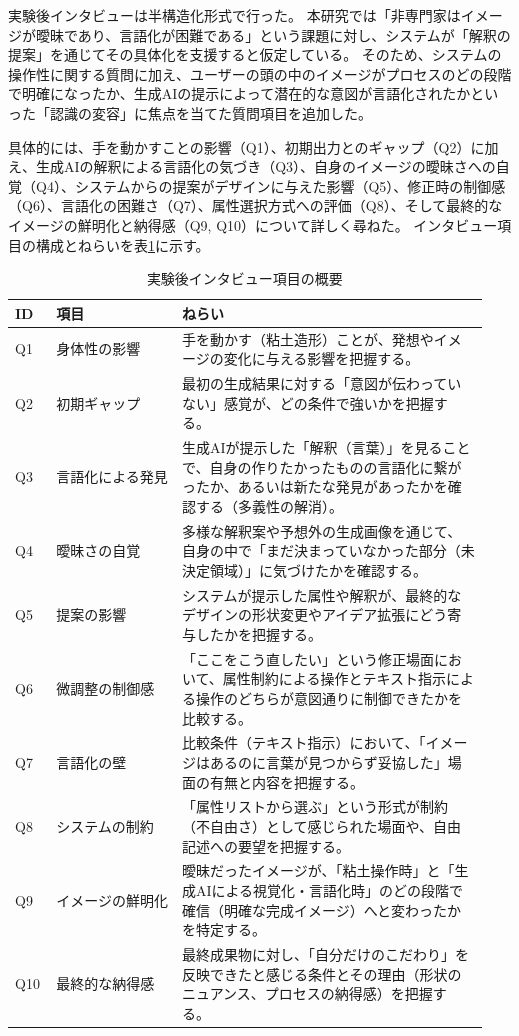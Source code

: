 \documentclass{kuisthesis}
\begin{document}
実験後インタビューは半構造化形式で行った。
本研究では「非専門家はイメージが曖昧であり、言語化が困難である」という課題に対し、システムが「解釈の提案」を通じてその具体化を支援すると仮定している。
そのため、システムの操作性に関する質問に加え、ユーザーの頭の中のイメージがプロセスのどの段階で明確になったか、生成AIの提示によって潜在的な意図が言語化されたかといった「認識の変容」に焦点を当てた質問項目を追加した。

具体的には、手を動かすことの影響（Q1）、初期出力とのギャップ（Q2）に加え、生成AIの解釈による言語化の気づき（Q3）、自身のイメージの曖昧さへの自覚（Q4）、システムからの提案がデザインに与えた影響（Q5）、修正時の制御感（Q6）、言語化の困難さ（Q7）、属性選択方式への評価（Q8）、そして最終的なイメージの鮮明化と納得感（Q9, Q10）について詳しく尋ねた。
インタビュー項目の構成とねらいを表\ref{tab:interview}に示す。

\begin{table}[H]
  \centering
  \caption{実験後インタビュー項目の概要}
  \label{tab:interview}
  \begin{tabular}{|p{0.08\linewidth}|p{0.25\linewidth}|p{0.61\linewidth}|}
    \hline
    ID & 項目 & ねらい \\
    \hline
    Q1 & 身体性の影響 & 手を動かす（粘土造形）ことが、発想やイメージの変化に与える影響を把握する。 \\
    \hline
    Q2 & 初期ギャップ & 最初の生成結果に対する「意図が伝わっていない」感覚が、どの条件で強いかを把握する。 \\
    \hline
    Q3 & 言語化による発見 & 生成AIが提示した「解釈（言葉）」を見ることで、自身の作りたかったものの言語化に繋がったか、あるいは新たな発見があったかを確認する（多義性の解消）。 \\
    \hline
    Q4 & 曖昧さの自覚 & 多様な解釈案や予想外の生成画像を通じて、自身の中で「まだ決まっていなかった部分（未決定領域）」に気づけたかを確認する。 \\
    \hline
    Q5 & 提案の影響 & システムが提示した属性や解釈が、最終的なデザインの形状変更やアイデア拡張にどう寄与したかを把握する。 \\
    \hline
    Q6 & 微調整の制御感 & 「ここをこう直したい」という修正場面において、属性制約による操作とテキスト指示による操作のどちらが意図通りに制御できたかを比較する。 \\
    \hline
    Q7 & 言語化の壁 & 比較条件（テキスト指示）において、「イメージはあるのに言葉が見つからず妥協した」場面の有無と内容を把握する。 \\
    \hline
    Q8 & システムの制約 & 「属性リストから選ぶ」という形式が制約（不自由さ）として感じられた場面や、自由記述への要望を把握する。 \\
    \hline
    Q9 & イメージの鮮明化 & 曖昧だったイメージが、「粘土操作時」と「生成AIによる視覚化・言語化時」のどの段階で確信（明確な完成イメージ）へと変わったかを特定する。 \\
    \hline
    Q10 & 最終的な納得感 & 最終成果物に対し、「自分だけのこだわり」を反映できたと感じる条件とその理由（形状のニュアンス、プロセスの納得感）を把握する。 \\
    \hline
  \end{tabular}
\end{table}
\end{document}
